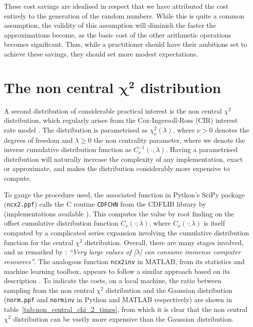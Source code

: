 \documentclass[manuscript,review]{acmart}
\begin{document}
These cost savings are idealised in respect that we have attributed the cost entirely to the generation of the random numbers. While this is quite a common assumption, the validity of this assumption will diminish the faster the approximations become, as the basic cost of the other arithmetic operations becomes significant. Thus, while a practitioner should have their ambitions set to achieve these savings, they should set more modest expectations.

\section{The non central \texorpdfstring{$ \bm{\chi^2} $}{chi-squared} distribution}
\label{sec:the_non_central_chi_squared_distribution}

A second distribution of considerable practical interest is the non central $ \chi^2 $ distribution, which regularly arises from the Cox-Ingersoll-Ross (CIR) interest rate model \citep{cox1985theory}. The distribution is parametrised as $ \chi^2_\nu(\lambda) $, where $ \nu > 0 $ denotes the degrees of freedom and $ \lambda \geq 0 $ the non centrality parameter, where we denote the inverse cumulative distribution function as $ C^{-1}_\nu(\cdot; \lambda) $. Having a parametrised distribution will naturally increase the complexity of any implementation, exact or approximate, and makes the distribution considerably more expensive to compute. 

To gauge the procedure used, the associated function in Python's SciPy package (\texttt{ncx2.ppf}) calls the C routine \texttt{CDFCHN} from the CDFLIB library by \citet{brown1994dcdflib} (implementations available \citep{burkardt2020cdflib}). This computes the value by root finding  \citep[algorithm~R]{bus1975two} on the offset cumulative distribution function $ C_\nu(\cdot;\lambda) $, where $ C_\nu(\cdot;\lambda) $ is itself computed by a complicated series expansion \citep[(26.4.25)]{abramowitz1948handbook} involving the cumulative distribution function for the central $ \chi^2 $ distribution. Overall, there are many stages involved, and as remarked by \citet[\texttt{cdflib.c}]{burkardt2020cdflib}: \textit{``Very large values of
[$ \lambda $] can consume immense computer resources''}. The analogous function \texttt{ncx2inv} in MATLAB, from its statistics and machine learning toolbox, appears to follow a similar approach based on its description \citep[page~4301]{matlab2018statistics}. To indicate the costs, on a local machine, the ratio between sampling from the non central $ \chi^2 $ distribution and the Gaussian distribution (\texttt{norm.ppf} and \texttt{norminv} in Python and MATLAB respectively) are shown in table~\ref{tab:non_central_chi_2_times}, from which it is clear that the non central $ \chi^2 $ distribution can be vastly more expensive than the Gaussian distribution. 
\end{document}
